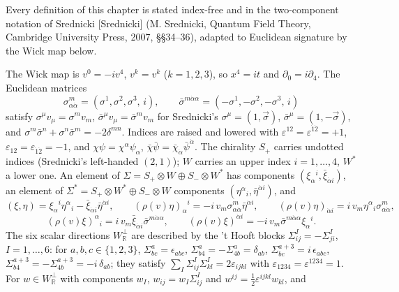 Every definition of this chapter is stated index-free and in the two-component notation of Srednicki [Srednicki] (M. Srednicki, Quantum Field Theory, Cambridge University Press, 2007, §§34--36), adapted to Euclidean signature by the Wick map below.

\begin{definition}
\label{def:c8-twocomp}
The Wick map is $v^0=-iv^4$, $v^k=v^k$ ($k=1,2,3$), so $x^4=it$ and $\partial_0=i\partial_4$. The Euclidean matrices
\[
\sigma^m_{\alpha\dot\alpha}=(\sigma^1,\sigma^2,\sigma^3,\,i),\qquad \bar\sigma^{m\dot\alpha\alpha}=(-\sigma^1,-\sigma^2,-\sigma^3,\,i)
\]
satisfy $\sigma^\mu v_\mu=\sigma^mv_m$, $\bar\sigma^\mu v_\mu=\bar\sigma^mv_m$ for Srednicki's $\sigma^\mu=(1,\vec\sigma)$, $\bar\sigma^\mu=(1,-\vec\sigma)$, and $\sigma^m\bar\sigma^n+\sigma^n\bar\sigma^m=-2\delta^{mn}$. Indices are raised and lowered with $\varepsilon^{12}=\varepsilon^{\dot1\dot2}=+1$, $\varepsilon_{12}=\varepsilon_{\dot1\dot2}=-1$, and $\chi\psi=\chi^\alpha\psi_\alpha$, $\bar\chi\bar\psi=\bar\chi_{\dot\alpha}\bar\psi^{\dot\alpha}$. The chirality $S_+$ carries undotted indices (Srednicki's left-handed $(2,1)$); $W$ carries an upper index $i=1,\dots,4$, $W^*$ a lower one. An element of $\Sigma=S_+\otimes W\oplus S_-\otimes W^*$ has components $(\xi_\alpha{}^i,\bar\xi_{\dot\alpha i})$, an element of $\Sigma^*=S_+\otimes W^*\oplus S_-\otimes W$ components $(\eta^\alpha{}_i,\bar\eta^{\dot\alpha i})$, and
\begin{equation}
(\xi,\eta)=\xi_\alpha{}^i\eta^\alpha{}_i-\bar\xi_{\dot\alpha i}\bar\eta^{\dot\alpha i},\qquad (\rho(v)\eta)_\alpha{}^i=-i\,v_m\sigma^m_{\alpha\dot\alpha}\bar\eta^{\dot\alpha i},\qquad (\rho(v)\eta)_{\dot\alpha i}=i\,v_m\eta^\alpha{}_i\sigma^m_{\alpha\dot\alpha},
\label{eq:c8-pairing}
\end{equation}
\[
(\rho(v)\xi)^\alpha{}_i=i\,v_m\bar\xi_{\dot\alpha i}\bar\sigma^{m\dot\alpha\alpha},\qquad (\rho(v)\xi)^{\dot\alpha i}=-i\,v_m\bar\sigma^{m\dot\alpha\alpha}\xi_\alpha{}^i .
\]
The six scalar directions $W_{\mathbb R}^\perp$ are described by the 't Hooft blocks $\Sigma^I_{ij}=-\Sigma^I_{ji}$, $I=1,\dots,6$: for $a,b,c\in\{1,2,3\}$, $\Sigma^a_{bc}=\epsilon_{abc}$, $\Sigma^a_{b4}=-\Sigma^a_{4b}=\delta_{ab}$, $\Sigma^{a+3}_{bc}=i\,\epsilon_{abc}$, $\Sigma^{a+3}_{b4}=-\Sigma^{a+3}_{4b}=-i\,\delta_{ab}$; they satisfy $\sum_I\Sigma^I_{ij}\Sigma^I_{kl}=2\varepsilon_{ijkl}$ with $\varepsilon_{1234}=\varepsilon^{1234}=1$. For $w\in W_{\mathbb R}^\perp$ with components $w_I$, $w_{ij}=w_I\Sigma^I_{ij}$ and $w^{ij}=\tfrac12\varepsilon^{ijkl}w_{kl}$, and

\end{definition}
